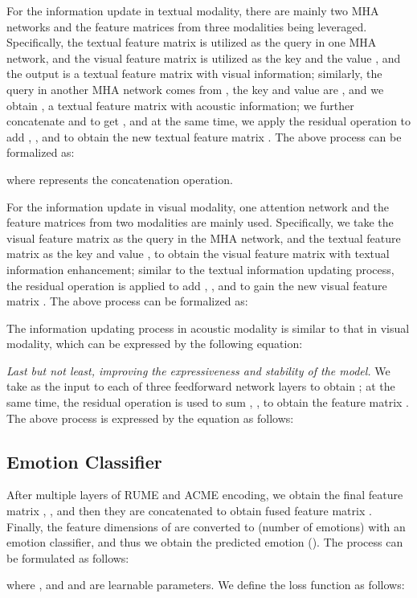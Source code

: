 \documentclass[journal]{IEEEtran}
\begin{document}
For the information update in textual modality, there are mainly two MHA networks and the feature matrices from three modalities being leveraged. Specifically, the textual feature matrix  is utilized as the query  in one MHA network, and the visual feature matrix  is utilized as the key  and the value , and the output  is a textual feature matrix with visual information; similarly, the query  in another MHA network comes from , the key  and value  are , and we obtain , a textual feature matrix with acoustic information; we further concatenate  and  to get , and at the same time, we apply the residual operation to add , , and  to obtain the new textual feature matrix . The above process can be formalized as:

where  represents the concatenation operation.

For the information update in visual modality, one attention network and the feature matrices from two modalities are mainly used. Specifically, we take the visual feature matrix  as the query  in the MHA network, and the textual feature matrix  as the key  and value , to obtain the visual feature matrix  with textual information enhancement; similar to the textual information updating process, the residual operation is applied to add , , and  to gain the new visual feature matrix . The above process can be formalized as: 


The information updating process in acoustic modality is similar to that in visual modality, which can be expressed by the following equation:


\textit{Last but not least, improving the expressiveness and stability of the model.} We take  as the input to each of three feedforward network layers to obtain ; at the same time, the residual operation is used to sum , ,  to obtain the feature matrix . The above process is expressed by the equation as follows: 


\subsection{Emotion Classifier}
After multiple layers of RUME and ACME encoding, we obtain the final feature matrix , , and then they are concatenated to obtain fused feature matrix . Finally, the feature dimensions of  are converted to  (number of emotions) with an emotion classifier, and thus we obtain the predicted emotion  (). The process can be formulated as follows:

where , and  and  are learnable parameters. We define the loss function as follows:
\end{document}
